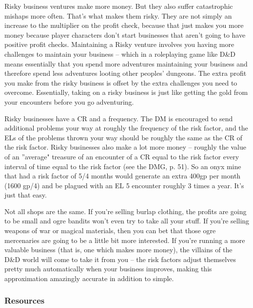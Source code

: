 Risky business ventures make more money. But they also suffer catastrophic mishaps more often. That's what makes them risky. They are not simply an increase to the multiplier on the profit check, because that just makes you more money because player characters don't start businesses that aren't going to have positive profit checks. Maintaining a Risky venture involves you having more challenges to maintain your business -- which in a roleplaying game like D\&D means essentially that you spend more adventures maintaining your business and therefore spend less adventures looting other peoples' dungeons. The extra profit you make from the risky business is offset by the extra challenges you need to overcome. Essentially, taking on a risky business is just like getting the gold from your encounters before you go adventuring.

Risky businesses have a CR and a frequency. The DM is encouraged to send additional problems your way at roughly the frequency of the risk factor, and the ELs of the problems thrown your way should be roughly the same as the CR of the risk factor. Risky businesses also make a lot more money -- roughly the value of an ''average" treasure of an encounter of a CR equal to the risk factor every interval of time equal to the risk factor (see the DMG, p. 51). So an onyx mine that had a risk factor of 5/4 months would generate an extra 400gp per month (1600 gp/4) and be plagued with an EL 5 encounter roughly 3 times a year. It's just that easy.

Not all shops are the same. If you're selling burlap clothing, the profits are going to be small and ogre bandits won't even try to take all your stuff. If you're selling weapons of war or magical materials, then you can bet that those ogre mercenaries are going to be a little bit more interested. If you're running a more valuable business (that is, one which makes more money), the villains of the D\&D world will come to take it from you -- the risk factors adjust themselves pretty much automatically when your business improves, making this approximation amazingly accurate in addition to simple.

\subsubsection{Resources}

